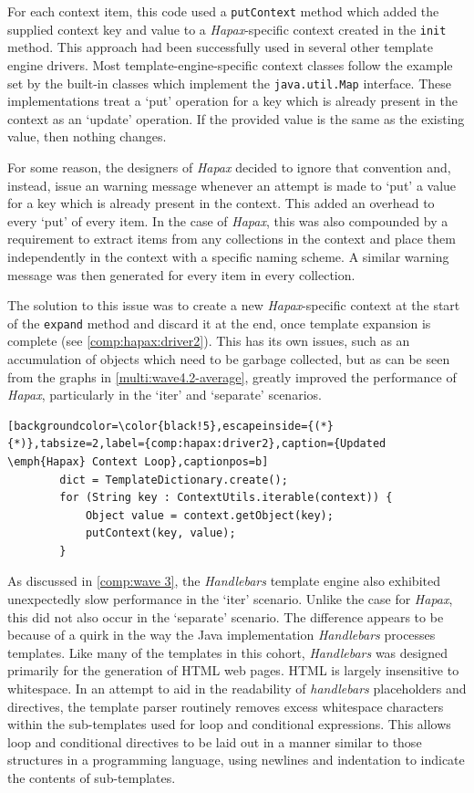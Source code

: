 For each context item, this code used a \verb!putContext! method which added the supplied context key and value to a \emph{Hapax}-specific context created in the \verb!init! method. This approach had been successfully used in several other template engine drivers. Most template-engine-specific context classes follow the example set by the built-in classes which implement the \verb!java.util.Map! interface. These implementations treat a `put' operation for a key which is already present in the context as an `update' operation. If the provided value is the same as the existing value, then nothing changes.

For some reason, the designers of \emph{Hapax} decided to ignore that convention and, instead, issue an warning message whenever an attempt is made to `put' a value for a key which is already present in the context. This added an overhead to every `put' of every item. In the case of \emph{Hapax}, this was also compounded by a requirement to extract items from any collections in the context and place them independently in the context with a specific naming scheme. A similar warning message was then generated for every item in every collection.

The solution to this issue was to create a new \emph{Hapax}-specific context at the start of the \verb!expand! method and discard it at the end, once template expansion is complete (see \autoref{comp:hapax:driver2}). This has its own issues, such as an accumulation of objects which need to be garbage collected, but as can be seen from the graphs in \autoref{multi:wave4.2-average}, greatly improved the performance of \emph{Hapax}, particularly in the `iter' and `separate' scenarios.

\begin{lstlisting}[backgroundcolor=\color{black!5},escapeinside={(*}{*)},tabsize=2,label={comp:hapax:driver2},caption={Updated \emph{Hapax} Context Loop},captionpos=b]
        dict = TemplateDictionary.create();
        for (String key : ContextUtils.iterable(context)) {
            Object value = context.getObject(key);
            putContext(key, value);
        }
\end{lstlisting}

As discussed in \autoref{comp:wave 3}, the \emph{Handlebars} template engine also exhibited unexpectedly slow performance in the `iter' scenario. Unlike the case for \emph{Hapax}, this did not also occur in the `separate' scenario. The difference appears to be because of a quirk in the way the Java implementation \emph{Handlebars} processes templates. Like many of the templates in this cohort, \emph{Handlebars} was designed primarily for the generation of HTML web pages. HTML is largely insensitive to whitespace. In an attempt to aid in the readability of \emph{handlebars} placeholders and directives, the template parser routinely removes excess whitespace characters within the sub-templates used for loop and conditional expressions. This allows loop and conditional directives to be laid out in a manner similar to those structures in a programming language, using newlines and indentation to indicate the contents of sub-templates.


